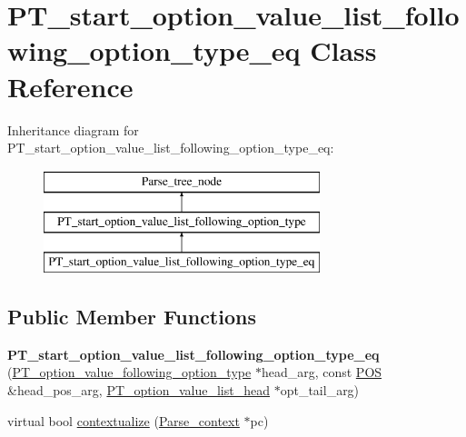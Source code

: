 \hypertarget{classPT__start__option__value__list__following__option__type__eq}{}\section{P\+T\+\_\+start\+\_\+option\+\_\+value\+\_\+list\+\_\+following\+\_\+option\+\_\+type\+\_\+eq Class Reference}
\label{classPT__start__option__value__list__following__option__type__eq}
Inheritance diagram for P\+T\+\_\+start\+\_\+option\+\_\+value\+\_\+list\+\_\+following\+\_\+option\+\_\+type\+\_\+eq\+:\begin{figure}[H]
\begin{center}
\leavevmode
\includegraphics[height=3.000000cm]{classPT__start__option__value__list__following__option__type__eq}
\end{center}
\end{figure}
\subsection*{Public Member Functions}
\begin{DoxyCompactItemize}
\item 
\mbox{\label{classPT__start__option__value__list__following__option__type__eq_a971016d36bbae2fcd1f169920245f305}} 
{\bfseries P\+T\+\_\+start\+\_\+option\+\_\+value\+\_\+list\+\_\+following\+\_\+option\+\_\+type\+\_\+eq} (\mbox{\hyperlink{classPT__option__value__following__option__type}{P\+T\+\_\+option\+\_\+value\+\_\+following\+\_\+option\+\_\+type}} $\ast$head\+\_\+arg, const \mbox{\hyperlink{structYYLTYPE}{P\+OS}} \&head\+\_\+pos\+\_\+arg, \mbox{\hyperlink{classPT__option__value__list__head}{P\+T\+\_\+option\+\_\+value\+\_\+list\+\_\+head}} $\ast$opt\+\_\+tail\+\_\+arg)
\item 
virtual bool \mbox{\hyperlink{classPT__start__option__value__list__following__option__type__eq_a748b216be3de04a1f758284578b630c2}{contextualize}} (\mbox{\hyperlink{structParse__context}{Parse\+\_\+context}} $\ast$pc)
\end{DoxyCompactItemize}
